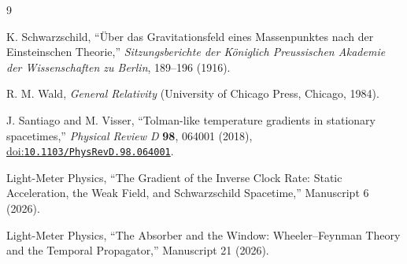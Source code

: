 \documentclass[12pt]{article}
\begin{document}
\begin{thebibliography}{9}
\small
{}
\raggedright
{}

K. Schwarzschild,
``\"Uber das Gravitationsfeld eines Massenpunktes nach der Einsteinschen Theorie,''
\emph{Sitzungsberichte der K\"oniglich Preussischen Akademie der Wissenschaften zu Berlin}, 189--196 (1916).

R. M. Wald,
\emph{General Relativity}
(University of Chicago Press, Chicago, 1984).

J. Santiago and M. Visser,
``Tolman-like temperature gradients in stationary spacetimes,''
\emph{Physical Review D} \textbf{98}, 064001 (2018),
\href{https://doi.org/10.1103/PhysRevD.98.064001}{doi:\nolinkurl{10.1103/PhysRevD.98.064001}}.

Light-Meter Physics,
``The Gradient of the Inverse Clock Rate: Static Acceleration, the Weak Field, and Schwarzschild Spacetime,''
Manuscript 6 (2026).

Light-Meter Physics,
``The Absorber and the Window: Wheeler--Feynman Theory and the Temporal Propagator,''
Manuscript 21 (2026).

\end{thebibliography}
\end{document}
